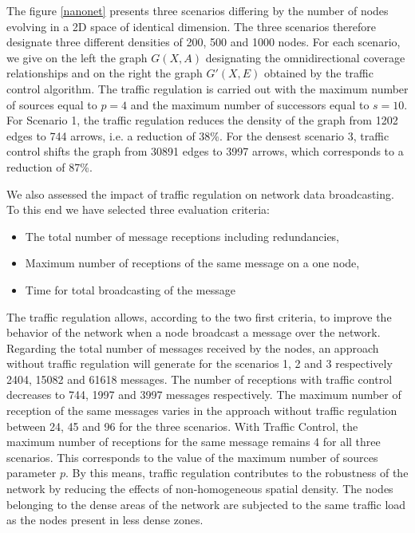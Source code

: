 \documentclass[letterpaper, 10 pt, conference]{ieeeconf}
\begin{document}
The figure \ref{nanonet} presents three scenarios differing by the number of nodes evolving in a 2D space of identical dimension. The three scenarios therefore designate three different densities of 200, 500 and 1000 nodes. For each scenario, we give on the left the graph $G(X, A)$ designating the omnidirectional coverage relationships and on the right the graph $G'(X, E)$ obtained by the traffic control algorithm. The traffic regulation is carried out with the maximum number of sources equal to $p=4$ and the maximum number of successors equal to $s=10$. For Scenario 1, the traffic regulation reduces the density of the graph from 1202 edges to 744 arrows, i.e. a reduction of 38\%. For the densest scenario 3, traffic control shifts the graph from 30891 edges to 3997 arrows, which corresponds to a reduction of 87\%.

We also assessed the impact of traffic regulation on network data broadcasting. To this end we have selected three evaluation criteria:

\begin{itemize}
\item The total number of message receptions including redundancies, 
\item Maximum number of receptions of the same message on a one node, 
\item Time for total broadcasting of the message 
\end{itemize} 

The traffic regulation allows, according to the two first criteria, to improve the behavior of the network when a node broadcast a message over the network. Regarding the total number of messages received by the nodes, an approach without traffic regulation will generate for the scenarios 1, 2 and 3 respectively 2404, 15082 and 61618 messages. The number of receptions with traffic control decreases to 744, 1997 and 3997 messages respectively. The maximum number of reception of the same messages varies in the approach without traffic regulation between 24, 45 and 96 for the three scenarios. With Traffic Control, the maximum number of receptions for the same message remains 4 for all three scenarios. This corresponds to the value of the maximum number of sources parameter $p$. By this means, traffic regulation contributes to the robustness of the network by reducing the effects of non-homogeneous spatial density. The nodes belonging to the dense areas of the network are subjected to the same traffic load as the nodes present in less dense zones.
\end{document}
